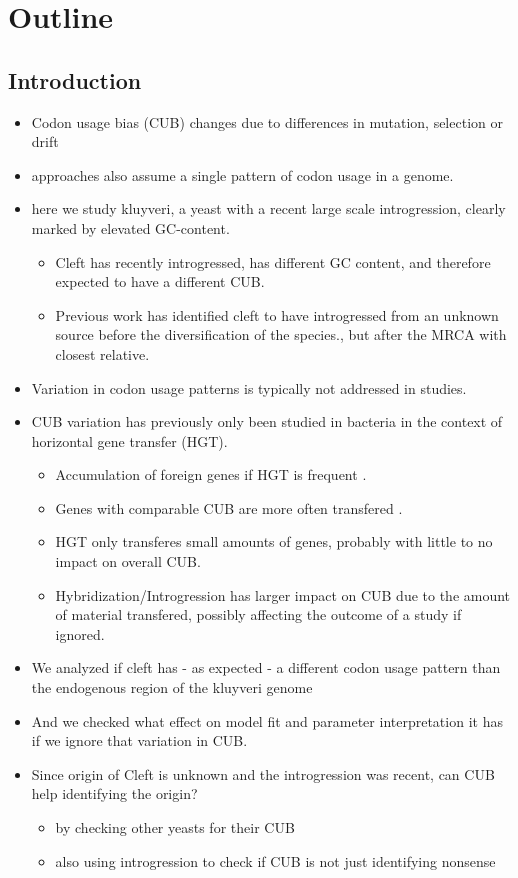 \documentclass[12pt]{article}
\begin{document}
\section*{Outline}
\subsection*{Introduction}
\begin{itemize}
	\item Codon usage bias (CUB) changes due to differences in mutation, selection or drift
	\item approaches also assume a single pattern of codon usage in a genome.
	\item here we study kluyveri, a yeast with a recent large scale introgression, clearly marked by elevated GC-content.
	\begin{itemize}
		\item Cleft has recently introgressed, has different GC content, and therefore expected to have a different CUB.
		\item Previous work has identified cleft to have introgressed from an unknown source before the diversification of the species., but after the MRCA with closest relative.
	\end{itemize}
	\item Variation in codon usage patterns is typically not addressed in studies.
	\item CUB variation has previously only been studied in bacteria in the context of horizontal gene transfer (HGT). 
	\begin{itemize}
		\item Accumulation of foreign genes if HGT is frequent \citep{lawrence1997}.
		\item Genes with comparable CUB are more often transfered \citep{tuller2011}.
		\item HGT only transferes small amounts of genes, probably with little to no impact on overall CUB.
		\item Hybridization/Introgression has larger impact on CUB due to the amount of material transfered, possibly affecting the outcome of a study if ignored.
	\end{itemize}
	\item We analyzed if cleft has - as expected - a different codon usage pattern than the endogenous region of the kluyveri genome
	\item And we checked what effect on model fit and parameter interpretation it has if we ignore that variation in CUB.
	\item Since origin of Cleft is unknown and the introgression was recent, can CUB help identifying the origin?
	\begin{itemize}
		\item by checking other yeasts for their CUB
		\item also using introgression to check if CUB is not just identifying nonsense
	\end{itemize}
\end{itemize}
\end{document}
